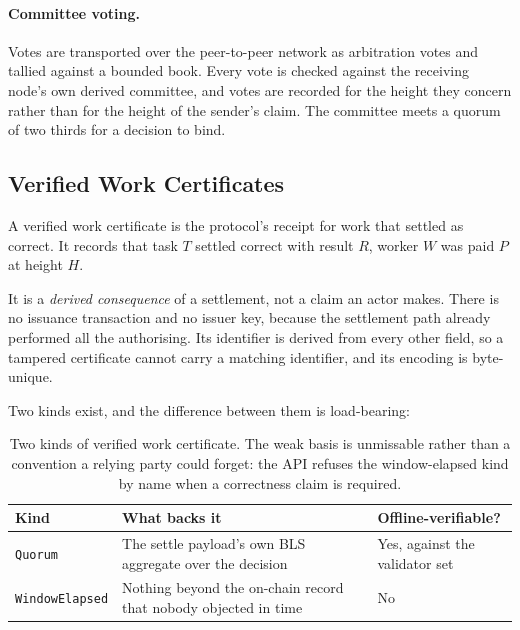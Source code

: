 \documentclass{article}
\begin{document}
\paragraph{Committee voting.} Votes are transported over the peer-to-peer
network as arbitration votes and tallied against a bounded book. Every vote is
checked against the receiving node's own derived committee, and votes are
recorded for the height they concern rather than for the height of the
sender's claim. The committee meets a quorum of two thirds for a decision to
bind.

\subsection{Verified Work Certificates}
\label{sec:vwc}

A verified work certificate is the protocol's receipt for work that settled
as correct. It records that task $T$ settled correct with result $R$, worker
$W$ was paid $P$ at height $H$.

It is a \emph{derived consequence} of a settlement, not a claim an actor
makes. There is no issuance transaction and no issuer key, because the
settlement path already performed all the authorising. Its identifier is
derived from every other field, so a tampered certificate cannot carry a
matching identifier, and its encoding is byte-unique.

Two kinds exist, and the difference between them is load-bearing:

\begin{table}[htbp]
\centering
\begin{tabular}{@{}p{}p{}p{}@{}}
\toprule
\textbf{Kind} & \textbf{What backs it} & \textbf{Offline-verifiable?} \\
\midrule
\texttt{Quorum} & The settle payload's own BLS aggregate over the decision &
  Yes, against the validator set \\
\texttt{WindowElapsed} & Nothing beyond the on-chain record that nobody
  objected in time & No \\
\bottomrule
\end{tabular}
\caption{Two kinds of verified work certificate. The weak basis is unmissable
rather than a convention a relying party could forget: the API refuses the
window-elapsed kind by name when a correctness claim is required.}
\label{tab:vwc}
\end{table}
\end{document}
